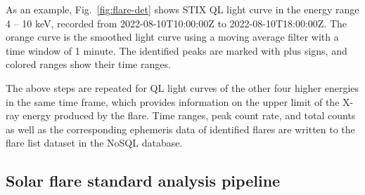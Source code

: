 \documentclass[referee]{aa} %
\begin{document}
As an example, Fig.~\ref{fig:flare-det}  shows  STIX QL  light curve  in the energy range 4 -- 10 keV, recorded from 
2022-08-10T10:00:00Z to 2022-08-10T18:00:00Z.  The orange curve is the smoothed light curve using a moving average filter with a time window
of 1 minute. 
The identified peaks are marked with plus signs, and colored ranges show their time ranges.


The above steps are repeated for QL light curves of the other four higher energies
in the same time frame, which provides information on the upper limit of the X-ray energy produced by the flare.
Time ranges, peak count rate, and total counts as well as the corresponding ephemeris data of identified flares are 
written to the flare list dataset in the NoSQL database.


\subsection{Solar flare standard analysis pipeline}
\end{document}
